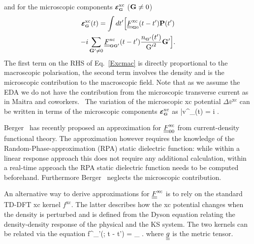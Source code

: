 and for the microscopic components $\boldsymbol{\scriptstyle \cal E}^{\text{xc}}_{\scriptscriptstyle\rm {\bf G}}$ (${\bf G}\neq 0$)
\begin{multline}
\boldsymbol{\scriptstyle \cal E}^{\text{xc}}_{\scriptscriptstyle\rm {\bf G}}(t)= \int dt' \Big[ \underline{\underline{F}}^{\text{xc}}_{\scriptscriptstyle\rm {\bf G} 0}(t-t') {\bf P}(t')  \\
                    -{i} \sum_{{\bf G}' \neq 0} \underline{\underline{F}}^{\text{xc}}_{\scriptscriptstyle\rm {\bf G}{\bf G}'}(t-t')\frac{ n_{\scriptscriptstyle\rm {\bf G}'}(t')}{{\rm G'}^2}{\bf G}' \Big] 
\label{Excmic}
\text{.}
\end{multline}
The first term on the RHS of Eq.~\eqref{Excmac} is directly proportional to the macroscopic polarisation, the second term involves the density and is the microscopic contribution to the macroscopic field. Note that as we assume the EDA we do not have the contribution from the microscopic transverse current as in Maitra and coworkers.~\cite{maitra2003current}
The variation of the microscopic xc potential $\Delta \bar v^{\text{xc}}$ can be written in terms of the microscopic components $\boldsymbol{\scriptstyle \cal E}^{\text{xc}}_{\scriptscriptstyle\rm {\bf G}}$ as
\be
\Delta \bar v^{}_{\sss \GG}(t) =  i .
\label{eq:pot_from_exc}
\ee
  
Berger~\cite{PhysRevLett.115.137402} has recently proposed an approximation for $\underline{\underline{F}}^{\text{xc}}_{00}$ from current-density functional theory. The approximation however requires the knowledge of the Random-Phase-approximation (RPA) static dielectric function: while within a linear response approach this does not require any additional calculation, within a real-time approach the RPA static dielectric function needs to be computed beforehand. Furthermore Berger~\cite{PhysRevLett.115.137402} neglects the microscopic contribution.

An alternative way to derive approximations for $\underline{\underline{F}}^{\text{xc}}_{}$ is to rely on the standard TD-DFT xc kernel $f^{\text{xc}}_{}$. The latter describes how the xc potential changes when the density is perturbed and is defined from the Dyson equation relating the density-density response of the physical and the KS system. The two kernels can be related via the equation
\be 
f^{}_{\sss \GG \GG'}(\qq{}; t - t') = \lim_{\qq{}} .  
\label{eq:k2k}
\ee 
where $\underline{\underline{g}}$ is the metric tensor.

